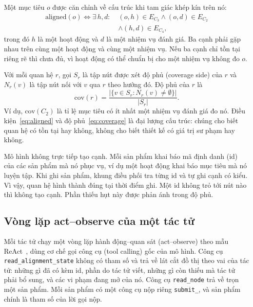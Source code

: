 \documentclass[conference,a4paper]{IEEEtran}
\begin{document}
Một mục tiêu $o$ được căn chỉnh về cấu trúc khi tam giác khép kín trên nó:
\begin{equation}
\label{eq:aligned}
\begin{aligned}
\mathrm{aligned}(o)\iff\exists\,h,d\colon\;&(o,h)\in E_{C_3}\wedge(o,d)\in E_{C_2}\\
&\wedge(h,d)\in E_{C_4},
\end{aligned}
\end{equation}
trong đó $h$ là một hoạt động và $d$ là một nhiệm vụ đánh giá. Ba cạnh phải gặp
nhau trên cùng một hoạt động và cùng một nhiệm vụ. Nếu ba cạnh chỉ tồn tại riêng rẽ
thì chưa đủ, vì hoạt động có thể chuẩn bị cho một nhiệm vụ không đo $o$.

Với mỗi quan hệ $r$, gọi $S_r$ là tập nút được xét độ phủ (coverage side) của $r$
và $N_r(v)$ là tập nút nối với $v$ qua $r$ theo hướng đó. Độ phủ của $r$ là
\begin{equation}
\label{eq:coverage}
\mathrm{cov}(r)=\frac{\bigl|\{v\in S_r\colon N_r(v)\neq\emptyset\}\bigr|}{|S_r|}.
\end{equation}
Ví dụ, $\mathrm{cov}(C_2)$ là tỉ lệ mục tiêu có ít nhất một nhiệm vụ đánh giá đo
nó. Điều kiện~\eqref{eq:aligned} và độ phủ~\eqref{eq:coverage} là đại lượng cấu
trúc: chúng cho biết quan hệ có tồn tại hay không, không cho biết thiết kế có giá
trị sư phạm hay không.

Mô hình không trực tiếp tạo cạnh. Mỗi sản phẩm khai báo mã định danh (id) của các
sản phẩm mà nó phục vụ, ví dụ một hoạt động khai báo mục tiêu mà nó luyện tập.
Khi ghi sản phẩm, khung điều phối tra từng id và tự ghi cạnh có kiểu. Vì vậy,
quan hệ hình thành đúng tại thời điểm ghi. Một id không trỏ tới nút nào thì không
tạo cạnh. Phần thiếu hụt này được phản ánh trong độ phủ.

\subsection{Vòng lặp act--observe của một tác tử}
\label{sec:loop}

Mỗi tác tử chạy một vòng lặp hành động--quan sát (act--observe) theo mẫu
ReAct~\cite{yao2023react}, dùng cơ chế gọi công cụ (tool calling) gốc của mô hình. Công cụ
\texttt{read\_alignment\_state} không có tham số và trả về lát cắt đồ thị theo vai
của tác tử: những gì đã có kèm id, phần do tác tử viết, những gì còn thiếu mà tác tử
phải bổ sung, và các vi phạm đang mở của nó. Công cụ \texttt{read\_node}
trả về trọn một sản phẩm. Mỗi sản phẩm có một công cụ nộp riêng
\texttt{submit\_<sản phẩm>}, và sản phẩm chính là tham số của lời gọi nộp.
\end{document}
